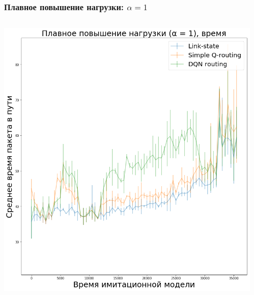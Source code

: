 \documentclass{beamer}
\begin{document}
\begin{frame}
\begin{columns}
\begin{column}{0.5\textwidth}
    \end{column}
  \end{columns}
\end{frame}


\begin{frame}
  \frametitle{Плавное повышение нагрузки: $\alpha = 1$}
  \begin{columns}
    \begin{column}{0.5\textwidth}
      \includegraphics[width=\textwidth]{experiment-conveyors-a1-time-tall}
    \end{column}
    \begin{column}{0.5\textwidth}

\end{column}
\end{columns}
\end{frame}
\end{document}
